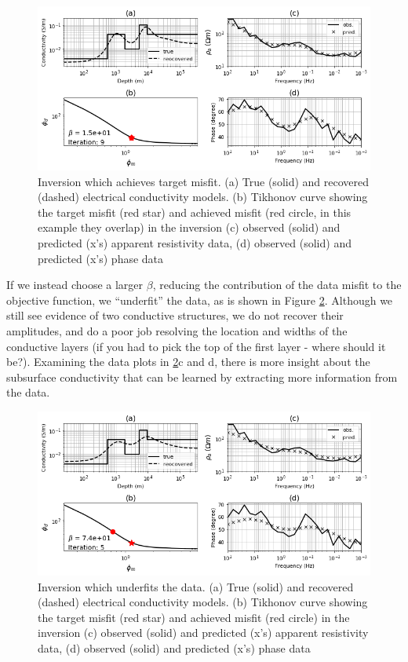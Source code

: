 \documentclass[11pt,oneside]{article}
\begin{document}
\begin{figure}[htb!]
    \centering
    \includegraphics[width=\textwidth]{images/justright.png}
\caption{Inversion which achieves target misfit. (a) True (solid) and recovered (dashed) electrical conductivity models. (b) Tikhonov curve showing the target misfit (red star) and achieved misfit (red circle, in this example they overlap) in the inversion (c) observed (solid) and predicted (x’s) apparent resistivity data, (d) observed (solid) and predicted (x’s) phase data}
\label{fig:justright}
\end{figure}

If we instead choose a larger $\beta$, reducing the contribution of the data misfit to the objective function, we ``underfit'' the data, as is shown in Figure \ref{fig:underfit}. Although we still see evidence of two conductive structures, we do not recover their amplitudes, and do a poor job resolving the location and widths of the conductive layers (if you had to pick the top of the first layer - where should it be?). Examining the data plots in \ref{fig:underfit}c and d, there is more insight about the subsurface conductivity that can be learned by extracting more information from the data.


\begin{figure}[htb!]
    \centering
    \includegraphics[width=\textwidth]{images/underfit.png}
\caption{Inversion which underfits the data. (a) True (solid) and recovered (dashed) electrical conductivity models. (b) Tikhonov curve showing the target misfit (red star) and achieved misfit (red circle) in the inversion (c) observed (solid) and predicted (x’s) apparent resistivity data, (d) observed (solid) and predicted (x’s) phase data}
\label{fig:underfit}
\end{figure}
\end{document}
